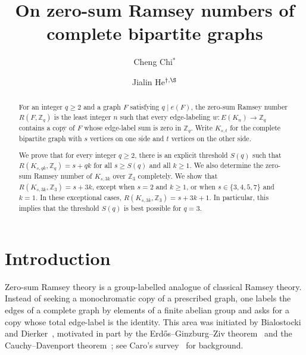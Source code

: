 ﻿\documentclass[11pt]{article}
\title{On zero-sum Ramsey numbers of complete bipartite graphs}
\author{Cheng Chi$^\ast$ 
\and Jialin He$^{\dagger,\S}$}
\date{}
\numberwithin{equation}{section}
\theoremstyle{remark}
\newcommand{\Z}{\mathbb Z}
\begin{document}
\maketitle
{}



\begin{abstract}
    For an integer $q\ge 2$ and a graph $F$ satisfying $q\mid e(F)$, the zero-sum Ramsey number $R(F,\Z_q)$ is the least integer $n$ such that every edge-labeling $w\colon E(K_n)\to \Z_q$ contains a copy of $F$ whose edge-label sum is zero in $\Z_q$.
    Write $K_{s,t}$ for the complete bipartite graph with $s$ vertices on one side and $t$ vertices on the other side.

    We prove that for every integer $q\ge2$, there is an explicit threshold $S(q)$ such that $R(K_{s,qk},\Z_q)=s+qk$ for all $s\ge S(q)$ and all $k\ge1$.
    We also determine the zero-sum Ramsey number of $K_{s,3k}$ over $\Z_3$ completely. 
    We show that $R(K_{s,3k},\Z_3)=s+3k$, except when $s=2$ and $k\ge1$, or when $s\in\{3,4,5,7\}$ and $k=1$.
    In these exceptional cases, $R(K_{s,3k},\Z_3)=s+3k+1$.
    In particular, this implies that the threshold $S(q)$ is best possible for \(q=3\).%
\end{abstract}



\section{Introduction}

Zero-sum Ramsey theory is a group-labelled analogue of classical Ramsey theory.
Instead of seeking a monochromatic copy of a prescribed graph, one labels the edges of a complete graph by elements of a finite abelian group and asks for a copy whose total edge-label is the identity.
This area was initiated by Bialostocki and Dierker~\cite{BD1990,BD1992}, motivated in part by the Erd\H{o}s--Ginzburg--Ziv theorem~\cite{EGZ1961} and the Cauchy--Davenport theorem~\cite{Cauchy1813,Davenport1935}; see Caro's survey~\cite{Caro1996} for background.
\end{document}
